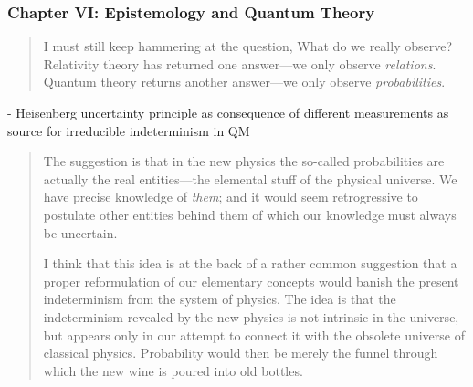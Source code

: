 \documentclass{article}
\begin{document}
\subsubsection{Chapter VI: Epistemology and Quantum Theory}

\begin{quote}
    I must still keep hammering at the question, What do we really observe?  Relativity theory has returned one answer---we only observe \emph{relations}.  Quantum theory returns another answer---we only observe \emph{probabilities}. \citep[p. 89]{Eddington1939}
\end{quote}

- Heisenberg uncertainty principle as consequence of different measurements as source for irreducible indeterminism in QM

\begin{quote}
    The suggestion is that in the new physics the so-called probabilities are actually the real entities---the elemental stuff of the physical universe.  We have precise knowledge of \emph{them}; and it would seem retrogressive to postulate other entities behind them of which our knowledge must always be uncertain.  

    I think that this idea is at the back of a rather common suggestion that a proper reformulation of our elementary concepts would banish the present indeterminism from the system of physics.  The idea is that the indeterminism revealed by the new physics is not intrinsic in the universe, but appears only in our attempt to connect it with the obsolete universe of classical physics.  Probability would then be merely the funnel through which the new wine is poured into old bottles.  


\end{quote}
\end{document}
